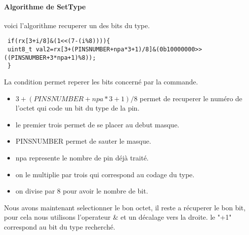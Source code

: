 \paragraph{Algorithme de SetType}
voici l'algorithme recuperer un des bits du type.



\begin{verbatim}
 if(rx[3+i/8]&(1<<(7-(i%8)))){
 uint8_t val2=rx[3+(PINSNUMBER+npa*3+1)/8]&(0b10000000>>((PINSNUMBER+3*npa+1)%8));
 }        
\end{verbatim}

La condition permet reperer les bits concerné par la commande.

\begin{itemize}
\item $3 + (PINSNUMBER + npa*3+1)/8$ permet de recuperer le numéro de l'octet qui code 
un bit du type de la pin.
\item le premier trois permet de se placer au debut masque.
\item PINSNUMBER permet de sauter le masque.
\item npa represente le nombre de pin déjà traité.
\item on le multiplie par trois qui correspond au codage du type.
\item on divise par 8 pour avoir le nombre de bit.
\end{itemize}

Nous avons maintenant selectionner le bon octet, il reste a récuperer le bon bit, pour cela nous utilisons l'operateur & et un décalage vers la droite.
le "+1" correspond au bit du type recherché.



